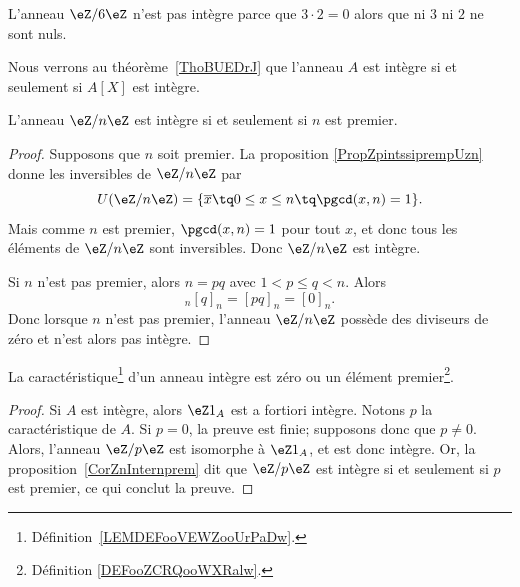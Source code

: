\begin{example}
	L'anneau \( \eZ/6\eZ\) n'est pas intègre parce que \( 3\cdot 2=0\) alors que ni \( 3\) ni \( 2\) ne sont nuls.
\end{example}

Nous verrons au théorème~\ref{ThoBUEDrJ} que l'anneau \( A\) est intègre si et seulement si \( A[X]\) est intègre.

\begin{corollary}   \label{CorZnInternprem}
	L'anneau \( \eZ/n\eZ\) est intègre si et seulement si \( n\) est premier.
\end{corollary}

\begin{proof}
	Supposons que \( n\) soit premier. La proposition \ref{PropZpintssiprempUzn} donne les inversibles de \( \eZ/n\eZ\) par
	\begin{equation}
		U(\eZ/n\eZ)=\{ \overline x\tq 0\leq x\leq n\tq\pgcd(x,n)=1 \}.
	\end{equation}
	Mais comme \( n\) est premier, \( \pgcd(x,n)=1\) pour tout \( x\), et donc tous les éléments de \( \eZ/n\eZ\) sont inversibles. Donc \( \eZ/n\eZ\) est intègre.

	Si \( n\) n'est pas premier, alors \( n=pq\) avec \( 1<p\leq q<n\). Alors
	\begin{equation}
		[p]_n[q]_n=[pq]_n=[0]_n.
	\end{equation}
	Donc lorsque \( n\) n'est pas premier,  l'anneau \( \eZ/n\eZ\) possède des diviseurs de zéro et n'est alors pas intègre.
\end{proof}


\begin{lemma}       \label{LemCaractIntergernbrcartpre}
	La caractéristique\footnote{Définition~\ref{LEMDEFooVEWZooUrPaDw}.} d'un anneau intègre est zéro ou un élément premier\footnote{Définition \ref{DEFooZCRQooWXRalw}.}.
\end{lemma}

\begin{proof}
	Si \( A\) est intègre, alors \( \eZ 1_A\) est a fortiori intègre. Notons \( p \) la caractéristique de \( A \). Si \( p = 0 \), la preuve est finie; supposons donc que \( p \neq 0 \). Alors, l'anneau \( \eZ/p\eZ\) est isomorphe à \( \eZ 1_A\), et est donc intègre. Or, la proposition~\ref{CorZnInternprem} dit que \( \eZ/p\eZ\) est intègre si et seulement si \( p\) est premier, ce qui conclut la preuve.
\end{proof}

